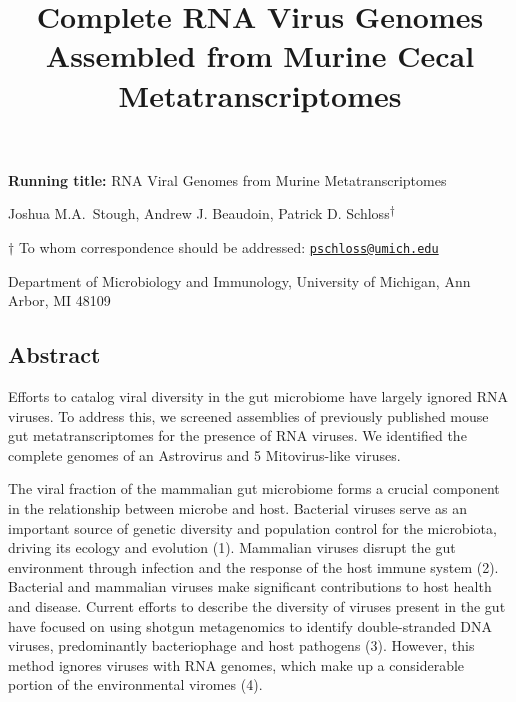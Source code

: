 \documentclass[
  11pt,
]{article}
\title{\textbf{Complete RNA Virus Genomes Assembled from Murine Cecal
Metatranscriptomes}}
\author{}
\date{\vspace{-2.5em}}
\begin{document}
\maketitle

\vspace{35mm}

\textbf{Running title:} RNA Viral Genomes from Murine Metatranscriptomes

\vspace{35mm}

Joshua M.A.~Stough, Andrew J. Beaudoin, Patrick D.
Schloss\textsuperscript{\(\dagger\)}

\vspace{40mm}

\(\dagger\) To whom correspondence should be addressed:
\href{mailto:pschloss@umich.edu}{\nolinkurl{pschloss@umich.edu}}

Department of Microbiology and Immunology, University of Michigan, Ann
Arbor, MI 48109

\newpage
\linenumbers

\hypertarget{abstract}{%
\subsection{Abstract}\label{abstract}}

Efforts to catalog viral diversity in the gut microbiome have largely
ignored RNA viruses. To address this, we screened assemblies of
previously published mouse gut metatranscriptomes for the presence of
RNA viruses. We identified the complete genomes of an Astrovirus and 5
Mitovirus-like viruses.

\newpage

The viral fraction of the mammalian gut microbiome forms a crucial
component in the relationship between microbe and host. Bacterial
viruses serve as an important source of genetic diversity and population
control for the microbiota, driving its ecology and evolution (1).
Mammalian viruses disrupt the gut environment through infection and the
response of the host immune system (2). Bacterial and mammalian viruses
make significant contributions to host health and disease. Current
efforts to describe the diversity of viruses present in the gut have
focused on using shotgun metagenomics to identify double-stranded DNA
viruses, predominantly bacteriophage and host pathogens (3). However,
this method ignores viruses with RNA genomes, which make up a
considerable portion of the environmental viromes (4).
\end{document}
